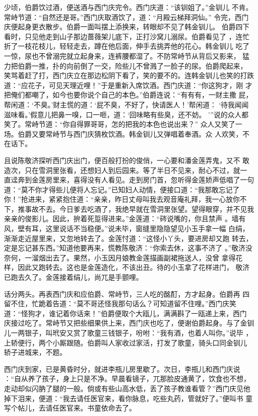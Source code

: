 少顷，伯爵饮过酒，便送酒与西门庆完令。西门庆道：“该钏姐了。”金钏儿
不肯。常峙节道：“自然还是哥。”西门庆取酒饮了，道：“月殿云梯拜洞仙。”
令完，西门庆便起身更衣散步。伯爵一面叫摆上添换来，转眼却不见了韩金钏儿。
伯爵四下看时，只见他走到山子那边蔷薇架儿底下，正打沙窝儿溺尿。伯爵看见了
，连忙折了一枝花枝儿，轻轻走去，蹲在他后面，伸手去挑弄他的花心。韩金钏儿
吃了一惊，尿也不曾溺完就立起身来，连裤腰都湿了。不防常峙节从背后又影来，
猛力把伯爵一推，扑的向前倒了一交，险些儿不曾溅了一脸子的尿。伯爵爬起来，
笑骂着赶了打，西门庆立在那边松阴下看了，笑的要不的。连韩金钏儿也笑的打跌
道：“应花子，可见天理近哩！”于是重新入席饮酒。西门庆道：“你这狗才，刚
才把俺们都嘲了，如今也要你说个自己的本色。”伯爵连说：“有有有，一财主撒
屁，帮闲道：‘不臭。’财主慌的道：‘屁不臭，不好了，快请医人！’帮闲道：
‘待我闻闻滋味看。’假意儿把鼻一嗅，口一咂，道：‘回味略有些臭，还不妨。
’”说的众人都笑了。常峙节道：“你自得罪哥哥，怎的把我的本色也说出来？”
众人又笑了一场。伯爵又要常峙节与西门庆猜枚饮酒。韩金钏儿又弹唱着奉酒。众
人欢笑，不在话下。

且说陈敬济探听西门庆出门，便百般打扮的俊俏，一心要和潘金莲弄鬼，又不
敢造次，只在雪洞里张看，还想妇人到后园来。等了半日不见来，耐心不过，就一
直迳奔到金莲房里来，喜得没有人看见。走到房门首，忽听得金莲娇声低唱了一句
道：“莫不你才得些儿便将人忘记。”已知妇人动情，便接口道：“我那敢忘记了
你！”抢进来，紧紧抱住道：“亲亲，昨日丈母叫我去观音庵礼拜，我一心放你不
下，推事故不去。今日爹去吃酒了，我绝早就在雪洞里张望。望得眼穿，并不见我
亲亲的俊影儿。因此，拚着死踅得进来。”金莲道：“硶说嘴的，你且禁声
。墙有风，壁有耳，这里说话不当稳便。”说未毕，窗缝里隐隐望见小玉手拿一幅
白绢，渐渐走近屋里来，又忽地转去了。金莲忖道：“这怪小丫头，要进房却又跑
转去，定是忘记甚东西。”知道他要再来，慌教陈敬济：“你索去休，这事不济了
。”敬济没奈何，一溜烟出去了。果然，小玉因月娘教金莲描画副裙拖送人，没曾
拿得花样，因此又跑转去。这也是金莲造化，不该出丑。待的小玉拿了花样进门，
敬济已跑去久了。金莲接着绢儿，尚兀是手颤哩。

话分两头。再表西门庆和应伯爵、常峙节，三人吃的酩酊，方才起身。伯爵再
四留不住，忙跪着告道：“莫不哥还怪我那句话么？可知道留不住哩。”西门庆笑
道：“怪狗才，谁记着你话来！”伯爵便取个大瓯儿，满满斟了一瓯递上来，西门
庆接过吃了。常峙节又把些细果供上来，西门庆也吃了，便谢伯爵起身。与了金钏
儿一两银子，叫玳安又赏了歌童三钱银子，吩咐：“我有酒，也着人叫你。”说毕
，上轿便行，两个小厮跟随。伯爵叫人家收过家活，打发了歌童，骑头口同金钏儿
轿子进城来，不题。

西门庆到家，已是黄昏时分，就进李瓶儿房里歇了。次日，李瓶儿和西门庆说
：“自从养了孩子，身上只是不净。早晨看镜子，兀那脸皮通黄了，饮食也不想，
走动却似闪肭了腿的一般。倘或有些山高水低，丢了孩子教谁看管？”西门庆见他
掉下泪来，便道：“我去请任医官来，看你脉息，吃些丸药，管就好了。”便叫书
童写个帖儿，去请任医官来。书童依命去了。

